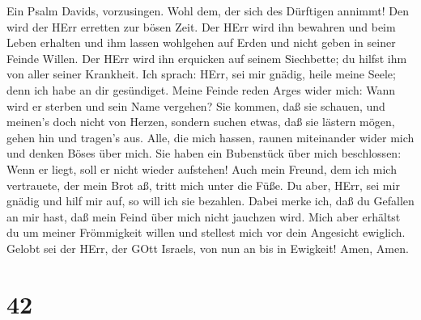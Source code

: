  Ein Psalm Davids, vorzusingen.  Wohl dem, der
sich des Dürftigen annimmt! Den wird der HErr erretten zur bösen Zeit.
 Der HErr wird ihn bewahren und beim Leben erhalten und ihm
lassen wohlgehen auf Erden und nicht geben in seiner Feinde Willen.
 Der HErr wird ihn erquicken auf seinem Siechbette; du
hilfst ihm von aller seiner Krankheit.  Ich sprach: HErr,
sei mir gnädig, heile meine Seele; denn ich habe an dir gesündiget.
 Meine Feinde reden Arges wider mich: Wann wird er sterben
und sein Name vergehen?  Sie kommen, daß sie schauen, und
meinen's doch nicht von Herzen, sondern suchen etwas, daß sie lästern
mögen, gehen hin und tragen's aus.  Alle, die mich hassen,
raunen miteinander wider mich und denken Böses über mich. 
Sie haben ein Bubenstück über mich beschlossen: Wenn er liegt, soll er
nicht wieder aufstehen!  Auch mein Freund, dem ich mich
vertrauete, der mein Brot aß, tritt mich unter die Füße. 
Du aber, HErr, sei mir gnädig und hilf mir auf, so will ich sie
bezahlen.  Dabei merke ich, daß du Gefallen an mir hast,
daß mein Feind über mich nicht jauchzen wird.  Mich aber
erhältst du um meiner Frömmigkeit willen und stellest mich vor dein
Angesicht ewiglich.  Gelobt sei der HErr, der GOtt Israels,
von nun an bis in Ewigkeit! Amen, Amen.

\hypertarget{section-41}{%
\section{42}\label{section-41}}


